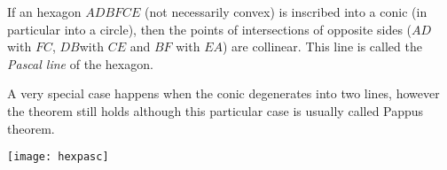 \documentclass[12pt]{article}
\begin{document}
If an hexagon $ADBFCE$ (not necessarily convex) is inscribed into a conic (in particular into a circle), then the points of intersections of opposite sides
($AD$ with $FC$, $DB$with $CE$ and $BF$ with $EA$) are collinear. This line is called the \emph{Pascal line} of the hexagon.

A very special case happens when the conic degenerates into two lines, however the theorem still holds although this particular case is usually called Pappus theorem.
\begin{center}
\texttt{[image: hexpasc]}
\end{center}
\end{document}
